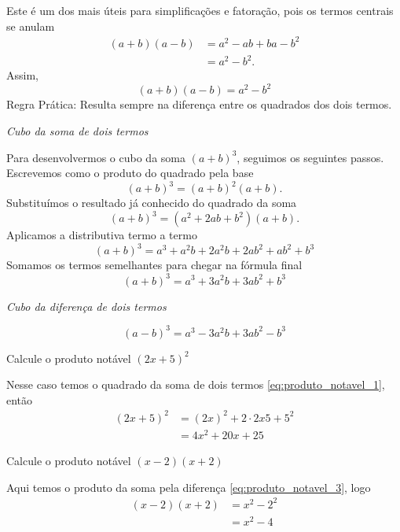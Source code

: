 Este é um dos mais úteis para simplificações e fatoração,
pois os termos centrais se anulam
\begin{align*}
  (a+b)(a-b)
  & = a^2 - ab + ba - b^2 \\
  & = a^2 - b^2.
\end{align*}
Assim,
\begin{equation}
  \label{eq:produto_notavel_3}
  (a+b)(a-b) = a^2 - b^2
\end{equation}
Regra Prática: Resulta sempre na diferença entre os quadrados dos dois termos.

\emph{Cubo da soma de dois termos}

Para desenvolvermos o cubo da soma $(a+b)^3$, seguimos os seguintes passos.
Escrevemos como o produto do quadrado pela base
\[
  (a+b)^3 = (a+b)^2 (a+b).
\]
Substituímos o resultado já conhecido do quadrado da soma
\[
  (a+b)^3 = (a^2 + 2ab + b^2) (a+b).
\]
Aplicamos a distributiva termo a termo
\[
  (a+b)^3 = a^3 + a^2b + 2a^2b + 2ab^2 + ab^2 + b^3
\]
Somamos os termos semelhantes para chegar na fórmula final
\begin{equation}
  \label{eq:produto_notavel_4}
  (a+b)^3 = a^3 + 3a^2b + 3ab^2 + b^3
\end{equation}

\emph{Cubo da diferença de dois termos}

\begin{equation}
  \label{eq:produto_notavel_5}
  (a-b)^3 = a^3 - 3a^2b + 3ab^2 - b^3
\end{equation}

\begin{example}
  Calcule o produto notável \((2x+5)^2\)

  \solution
  Nesse caso temos o quadrado da soma de dois termos
  \eqref{eq:produto_notavel_1}, então
  \begin{align*}
    (2x+5)^2
    & = (2x)^2 + 2\cdot2 x 5 + 5^2   \\
    & = 4x^2 + 20x + 25
  \end{align*}
\end{example}

\begin{example}
  Calcule o produto notável \((x-2)(x+2)\)

  \solution
  Aqui temos o produto da soma pela diferença
  \eqref{eq:produto_notavel_3}, logo
  \begin{align*}
    (x-2)(x+2)
    & = x^2 - 2^2   \\
    & = x^2 - 4
  \end{align*}
\end{example}

